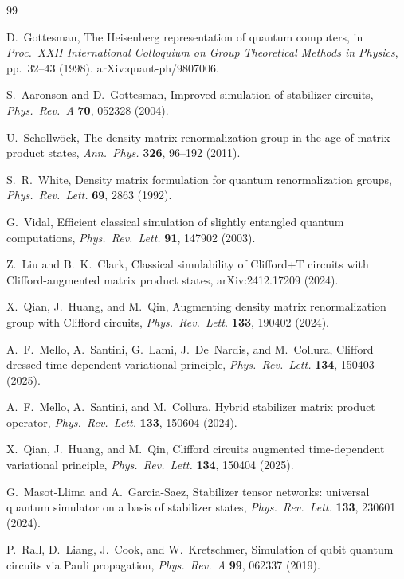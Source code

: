 \documentclass[a4paper,twocolumn,11pt]{quantumarticle}
\begin{document}

\begin{thebibliography}{99}

D.~Gottesman,
The Heisenberg representation of quantum computers,
in \textit{Proc.\ XXII International Colloquium on Group Theoretical Methods in Physics},
pp.~32--43 (1998).
arXiv:quant-ph/9807006.

S.~Aaronson and D.~Gottesman,
Improved simulation of stabilizer circuits,
\textit{Phys.\ Rev.\ A} \textbf{70}, 052328 (2004).

U.~Schollw\"{o}ck,
The density-matrix renormalization group in the age of matrix product states,
\textit{Ann.\ Phys.} \textbf{326}, 96--192 (2011).

S.~R.~White,
Density matrix formulation for quantum renormalization groups,
\textit{Phys.\ Rev.\ Lett.} \textbf{69}, 2863 (1992).

G.~Vidal,
Efficient classical simulation of slightly entangled quantum computations,
\textit{Phys.\ Rev.\ Lett.} \textbf{91}, 147902 (2003).

Z.~Liu and B.~K.~Clark,
Classical simulability of Clifford+T circuits with Clifford-augmented matrix product states,
arXiv:2412.17209 (2024).

X.~Qian, J.~Huang, and M.~Qin,
Augmenting density matrix renormalization group with Clifford circuits,
\textit{Phys.\ Rev.\ Lett.} \textbf{133}, 190402 (2024).

A.~F.~Mello, A.~Santini, G.~Lami, J.~De~Nardis, and M.~Collura,
Clifford dressed time-dependent variational principle,
\textit{Phys.\ Rev.\ Lett.} \textbf{134}, 150403 (2025).

A.~F.~Mello, A.~Santini, and M.~Collura,
Hybrid stabilizer matrix product operator,
\textit{Phys.\ Rev.\ Lett.} \textbf{133}, 150604 (2024).

X.~Qian, J.~Huang, and M.~Qin,
Clifford circuits augmented time-dependent variational principle,
\textit{Phys.\ Rev.\ Lett.} \textbf{134}, 150404 (2025).

G.~Masot-Llima and A.~Garcia-Saez,
Stabilizer tensor networks: universal quantum simulator on a basis of stabilizer states,
\textit{Phys.\ Rev.\ Lett.} \textbf{133}, 230601 (2024).

P.~Rall, D.~Liang, J.~Cook, and W.~Kretschmer,
Simulation of qubit quantum circuits via Pauli propagation,
\textit{Phys.\ Rev.\ A} \textbf{99}, 062337 (2019).


\end{thebibliography}
\end{document}
